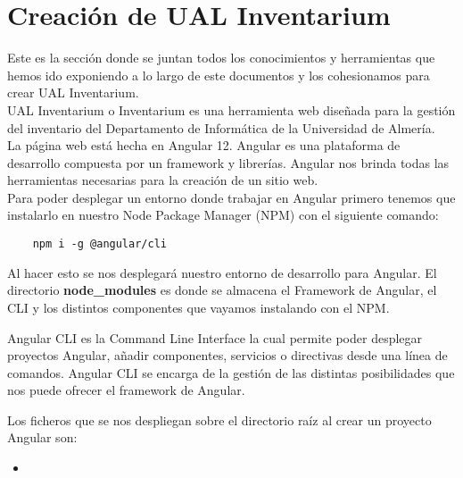 \section{Creación de UAL Inventarium}
Este es la sección donde se juntan todos los conocimientos y herramientas que hemos ido exponiendo a lo largo de este documentos y los cohesionamos para crear UAL Inventarium.
\\UAL Inventarium o Inventarium es una herramienta web diseñada para la gestión del inventario del Departamento de Informática de la Universidad de Almería.
\\La página web está hecha en Angular 12. Angular es una plataforma de desarrollo compuesta por un framework y librerías. Angular nos brinda todas las herramientas necesarias para la creación de un sitio web.
\\Para poder desplegar un entorno donde trabajar en Angular primero tenemos que instalarlo en nuestro Node Package Manager (NPM) con el siguiente comando:
\begin{verbatim}
    npm i -g @angular/cli
\end{verbatim}
Al hacer esto se nos desplegará nuestro entorno de desarrollo para Angular. El directorio \textbf{node\_modules} es donde se almacena el Framework de Angular, el CLI y los distintos componentes que vayamos instalando con el NPM.
\begin{tcolorbox}
    [colback=green!5!white,colframe=green!75!black,fonttitle=\bfseries,title=¿Qué diferencias hay entre Angular CLI y Angular Framework?]
    Angular CLI es la Command Line Interface la cual permite poder desplegar proyectos Angular, añadir componentes, servicios o directivas desde una línea de comandos. Angular CLI se encarga de la gestión de las distintas posibilidades que nos puede ofrecer el framework de Angular.
\end{tcolorbox}
Los ficheros que se nos despliegan sobre el directorio raíz al crear un proyecto Angular son:
\begin{itemize}
    \item
\end{itemize}
